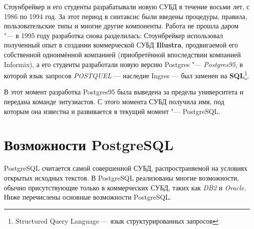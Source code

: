 \documentclass[a4paper,12pt,notitlepage,headsepline,pdftex]{scrartcl}
\begin{document}
  Стоунбрейкер и его студенты разрабатывали новую СУБД в течение восьми лет, с
  1986 по 1994 год.
  За этот период в синтаксис были введены процедуры, правила, пользовательские
  типы и многие другие компоненты.
  Работа не прошла даром "--- в 1995 году разработка снова разделилась:
  Стоунбрейкер использовал полученный опыт в создании коммерческой СУБД
  \textbf{Illustra}, продвигаемой его собственной одноимённой компанией
  (приобретённой впоследствии компанией Informix), а его студенты разработали
  новую версию Postgres "--- \emph{Postgres95}, в которой язык запросов
  \emph{POSTQUEL} --- наследие Ingres --- был заменен на
  \textbf{SQL}\footnote{Structured Query Language --- язык структурированных
  запросов}.

  В этот момент разработка Postgres95 была выведена за пределы университета и
  передана команде энтузиастов.
  С этого момента СУБД получила имя, под которым она известна и развивается в
  текущий момент "--- PostgreSQL.\cite{ruwiki}
  \pagebreak

\section{Возможности PostgreSQL}
  PostgreSQL считается самой совершенной СУБД, распространяемой на условиях
  открытых исходных текстов.
  В PostgreSQL реализованы многие возможности, обычно присутствующие только в
  коммерческих СУБД, таких как \emph{DB2} и \emph{Oracle}.
  Ниже перечислены основные возможности PostgreSQL.
\end{document}
